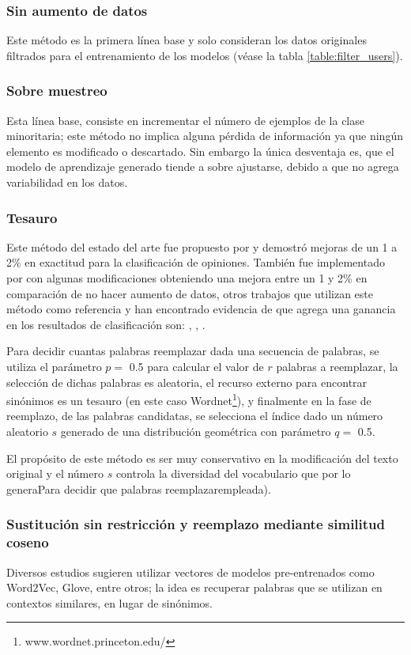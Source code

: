 \subsubsection{Sin aumento de datos}
Este método es la primera línea base y solo consideran los datos originales filtrados para el entrenamiento de los modelos (véase la tabla \ref{table:filter_users}).

\subsubsection{Sobre muestreo}
Esta línea base, consiste en incrementar el número de ejemplos de la clase minoritaria; este método no implica alguna pérdida de información ya que ningún elemento es modificado o descartado. Sin embargo la única desventaja es, que el modelo de aprendizaje generado tiende a sobre ajustarse, debido a que no agrega variabilidad en los datos.

\subsubsection{Tesauro}
Este método del estado del arte fue propuesto por \citep{zhang2015character} y demostró mejoras de un 1 a 2\% en exactitud para la clasificación de opiniones. También fue implementado por \citep{wei2019eda} con algunas modificaciones obteniendo una mejora entre un 1 y 2\% en comparación de no hacer aumento de datos, otros trabajos que utilizan este método como referencia y han encontrado evidencia de que agrega una ganancia en los resultados de clasificación son: \citep{jungiewicz2019towards}, \citep{kumar2019submodular}, \citep{park2019self}.

Para decidir cuantas palabras reemplazar dada una secuencia de palabras, se utiliza el parámetro $p=$ 0.5 para calcular el valor de $r$ palabras a reemplazar, la selección de dichas palabras es aleatoria, el recurso externo para encontrar sinónimos es un tesauro (en este caso Wordnet\footnote{www.wordnet.princeton.edu/}), y finalmente en la fase de reemplazo, de las palabras candidatas, se selecciona el índice dado un número aleatorio $s$ generado de una distribución geométrica con parámetro $q=$ 0.5.

El propósito de este método es ser muy conservativo en la modificación del texto original y el número $s$ controla la diversidad del vocabulario que por lo generaPara decidir que palabras reemplazarempleada).

\subsubsection{Sustitución sin restricción y reemplazo mediante similitud coseno}
Diversos estudios sugieren utilizar vectores de modelos pre-entrenados como Word2Vec, Glove, entre otros; la idea es recuperar palabras que se utilizan en contextos similares, en lugar de sinónimos. 


